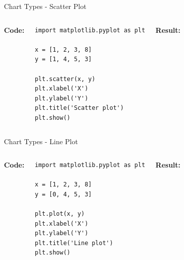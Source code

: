 \documentclass[aspectratio=169]{beamer}
\begin{document}
\begin{frame}[fragile]{Chart Types - Scatter Plot}
\begin{columns}[T]
\textbf{Code:}
\begin{lstlisting}
import matplotlib.pyplot as plt

x = [1, 2, 3, 8]
y = [1, 4, 5, 3]

plt.scatter(x, y)
plt.xlabel('X')
plt.ylabel('Y')
plt.title('Scatter plot')
plt.show()
\end{lstlisting}

\textbf{Result:}
\begin{center}
\end{center}
\end{columns}
\end{frame}

\begin{frame}[fragile]{Chart Types - Line Plot}
\begin{columns}[T]
\textbf{Code:}
\begin{lstlisting}
import matplotlib.pyplot as plt

x = [1, 2, 3, 8]
y = [0, 4, 5, 3]

plt.plot(x, y)
plt.xlabel('X')
plt.ylabel('Y')
plt.title('Line plot')
plt.show()
\end{lstlisting}

\textbf{Result:}
\begin{center}
\end{center}
\end{columns}
\end{frame}
\end{document}
